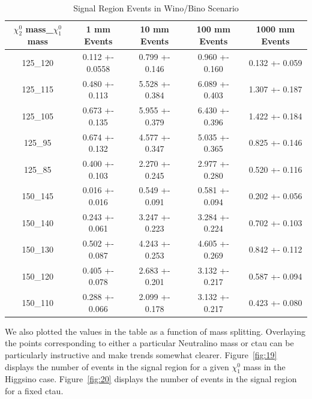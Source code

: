 \documentclass{article}
\begin{document}
\begin{table}[H]
        \centering
        \begin{tabular}{||c|c|c|c|c||}
        \hline
        {$\chi_{2}^{0}$ mass}\_{$\chi_{1}^{0}$ mass} & 1 mm Events & 10 mm Events & 100 mm Events & 1000 mm Events \\
        \hline
        125\_120 & 0.112 +- 0.0558 & 0.799 +- 0.146 & 0.960 +- 0.160 & 0.132 +- 0.059 \\
        125\_115 & 0.480 +- 0.113 & 5.528 +- 0.384 & 6.089 +- 0.403	& 1.307 +- 0.187 \\
        125\_105 & 0.673 +- 0.135 & 5.955 +- 0.379 & 6.430 +- 0.396	& 1.422 +- 0.184 \\
        125\_95	& 0.674 +- 0.132 & 4.577 +- 0.347 & 5.035 +- 0.365 & 0.825 +- 0.146 \\
        125\_85	& 0.400 +- 0.103 & 2.270 +- 0.245 & 2.977 +- 0.280 & 0.520 +- 0.116 \\
		\hline
		\hline
        150\_145 & 0.016 +- 0.016 & 0.549 +- 0.091 & 0.581 +- 0.094 & 0.202 +- 0.056 \\
        150\_140 & 0.243 +- 0.061 & 3.247 +- 0.223 & 3.284 +- 0.224 & 0.702 +- 0.103 \\
        150\_130 & 0.502 +- 0.087 & 4.243 +- 0.253 & 4.605 +- 0.269 & 0.842 +- 0.112 \\
        150\_120 & 0.405 +- 0.078 & 2.683 +- 0.201 & 3.132 +- 0.217 & 0.587 +- 0.094 \\
        150\_110 & 0.288 +- 0.066 & 2.099 +- 0.178 & 3.132 +- 0.217 & 0.423 +- 0.080 \\
        \hline
        \end{tabular}
        \caption{Signal Region Events in Wino/Bino Scenario}
        \label{table:5}
\end{table}
\par
We also plotted the values in the table as a function of mass splitting. Overlaying the points corresponding to either a particular Neutralino mass or ctau can be particularly instructive and make trends somewhat clearer. Figure~\ref{fig:19} displays the number of events in the signal region for a given $\chi_{1}^{0}$ mass in the Higgsino case. Figure~\ref{fig:20} displays the number of events in the signal region for a fixed ctau.
\par
\end{document}
